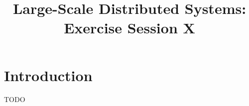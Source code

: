 

\title{Large-Scale Distributed Systems: Exercise Session X}
\maketitle

\section{Introduction}
\label{sec:introduction}

TODO


